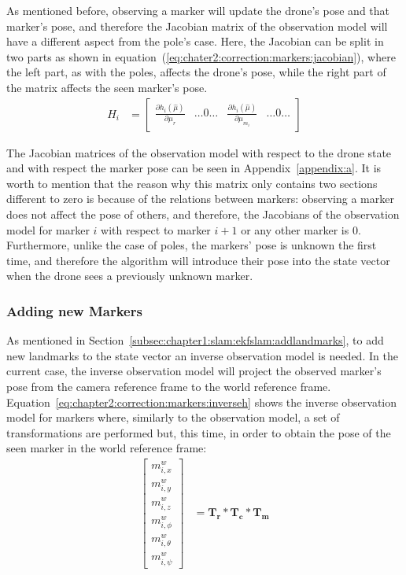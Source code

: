 As mentioned before, observing a marker will update the drone's pose and that marker's pose, and therefore the Jacobian matrix of the observation model will have a different aspect from the pole's case. Here, the Jacobian can be split in two parts as shown in equation~(\ref{eq:chater2:correction:markers:jacobian}), where the left part, as with the poles, affects the drone's pose, while the right part of the matrix affects the seen marker's pose.
\begin{align}
    H_i &= \begin{bmatrix}
        \frac{\partial h_i(\hat\mu)}{\partial \mu_r} & \dots0\dots & \frac{\partial h_i(\hat\mu)}{\partial \mu_{m_i}} & \dots0\dots
    \end{bmatrix}
    \label{eq:chater2:correction:markers:jacobian}
\end{align}

The Jacobian matrices of the observation model with respect to the drone state and with respect the marker pose can be seen in Appendix~\ref{appendix:a}. It is worth to mention that the reason why this matrix only contains two sections different to zero is because of the relations between markers: observing a marker does not affect the pose of others, and therefore, the Jacobians of the observation model for marker $i$ with respect to marker $i+1$ or any other marker is 0.\\

Furthermore, unlike the case of poles, the markers' pose is unknown the first time, and therefore the algorithm will introduce their pose into the state vector when the drone sees a previously unknown marker.

\subsubsection{Adding new Markers}
\label{subsubsec:chapter2:correction:markers:add}
\nocite{slam-auto-mob-robots}
As mentioned in Section~\ref{subsec:chapter1:slam:ekfslam:addlandmarks}, to add new landmarks to the state vector an inverse observation model is needed. In the current case, the inverse observation model will project the observed marker's pose from the camera reference frame to the world reference frame. Equation~\ref{eq:chapter2:correction:markers:inverseh} shows the inverse observation model for markers where, similarly to the observation model, a set of transformations are performed but, this time, in order to obtain the pose of the seen marker in the world reference frame:
\begin{align}
    \begin{bmatrix}
        m_{i, x}^w \\ m_{i, y}^w \\ m_{i, z}^w \\ m_{i, \phi}^w \\ m_{i, \theta}^w \\ m_{i, \psi}^w
    \end{bmatrix} &= \bm{T_r} * \bm{T_c} * \bm{T_m}
    \label{eq:chapter2:correction:markers:inverseh}
\end{align}

